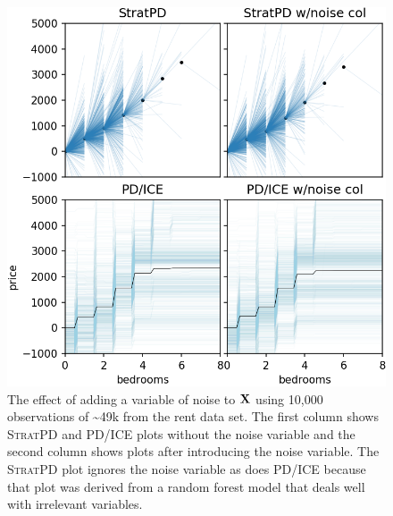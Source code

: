 \documentclass[12pt]{article}
\newcommand{\spd}{\fontfamily{cmr}\textsc{\small StratPD}}
\begin{document}
\begin{figure}[htbp]
\begin{center}
\includegraphics[scale=0.6]{images/bedrooms_vs_price_noise.png}
\caption{The effect of adding a variable of noise to $\bf X$ using 10,000 observations of \textasciitilde49k from the rent data set. The first column shows \spd{} and PD/ICE plots without the noise variable and the second column shows plots after introducing the noise variable. The \spd{} plot ignores the noise variable as does PD/ICE because that plot was derived from a random forest model that deals well with irrelevant variables.}
\label{fig:beds_noise}
\end{center}
\end{figure}
\end{document}
